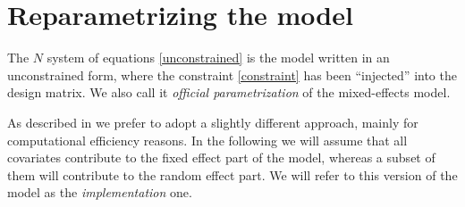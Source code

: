 \section{Reparametrizing the model}\label{repar}
The $N$ system of equations \ref{unconstrained} is the model written in an
unconstrained form, where the constraint \ref{constraint} has been “injected”
into the design matrix. We also call it \textit{official parametrization} of
the mixed-effects model.

As described in \cite{kim} we prefer to adopt a slightly different approach,
mainly for computational efficiency reasons. In the following we will assume
that all covariates contribute to the fixed effect part of the model, whereas a
subset of them will contribute to the random effect part. We will refer to this
version of the model as the \textit{implementation} one.

